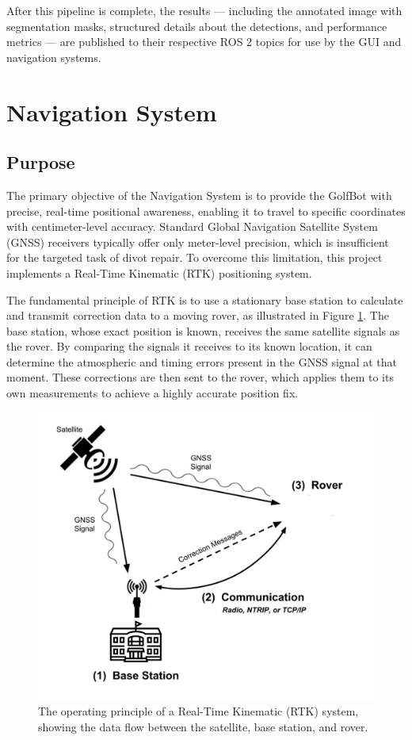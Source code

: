 After this pipeline is complete, the results — including the annotated image with segmentation masks, structured details about the detections, and performance metrics — are published to their respective ROS 2 topics for use by the GUI and navigation systems.


\section{Navigation System}
\label{sec:nav_implementation}

\subsection{Purpose}
\label{ssec:nav_intro}
The primary objective of the Navigation System is to provide the GolfBot with precise, real-time positional awareness, enabling it to travel to specific coordinates with centimeter-level accuracy. Standard Global Navigation Satellite System (GNSS) receivers typically offer only meter-level precision, which is insufficient for the targeted task of divot repair. To overcome this limitation, this project implements a Real-Time Kinematic (RTK) positioning system.

The fundamental principle of RTK is to use a stationary base station to calculate and transmit correction data to a moving rover, as illustrated in Figure \ref{fig:rtk_concept}. The base station, whose exact position is known, receives the same satellite signals as the rover. By comparing the signals it receives to its known location, it can determine the atmospheric and timing errors present in the GNSS signal at that moment. These corrections are then sent to the rover, which applies them to its own measurements to achieve a highly accurate position fix.

\begin{figure}[h!]
    \centering
    \includegraphics[width=0.8\linewidth]{figures/rtk.PNG}
    \caption[The operating principle of a Real-Time Kinematic (RTK) system.]%
    {The operating principle of a Real-Time Kinematic (RTK) system, showing the data flow between the satellite, base station, and rover.}
    \label{fig:rtk_concept}
\end{figure}

